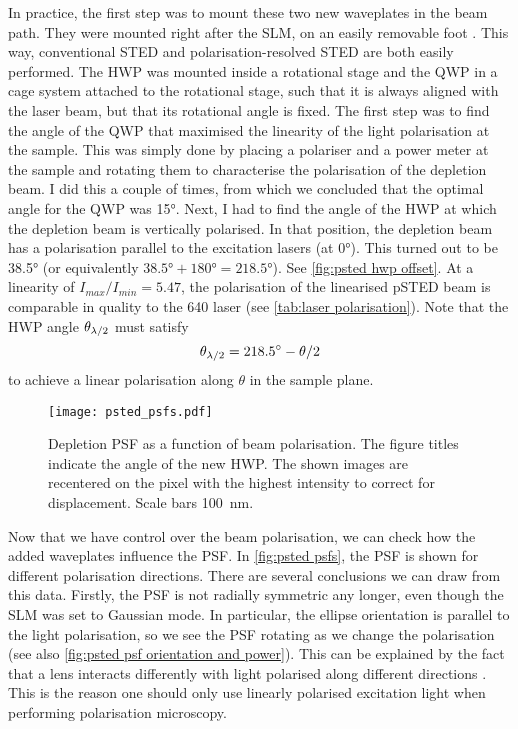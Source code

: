 In practice, the first step was to mount these two new waveplates in the beam path. They were mounted right after the SLM, on an easily removable foot .  This way, conventional STED and polarisation-resolved STED are both easily performed. The HWP was mounted inside a rotational stage and the QWP in a cage system attached to the rotational stage, such that it is always aligned with the laser beam, but that its rotational angle is fixed. The first step was to find the angle of the QWP that maximised the linearity of the light polarisation at the sample. This was simply done by placing a polariser and a power meter at the sample and rotating them to characterise the polarisation of the depletion beam. I did this a couple of times, from which we concluded that the optimal angle for the QWP was \ang{15}. Next, I had to find the angle of the HWP at which the depletion beam is vertically polarised. In that position, the depletion beam has a polarisation parallel to the excitation lasers (at \ang{0}). This turned out to be \ang{38.5} (or equivalently $\ang{38.5}+\ang{180}=\ang{218.5}$). See \autoref{fig:psted hwp offset}. At a linearity of $ I_{max}/I_{min} = 5.47 $, the polarisation of the linearised pSTED beam is comparable in quality to the 640 laser (see \autoref{tab:laser polarisation}). Note that the HWP angle $ \theta_{\lambda/2} $ must satisfy
\begin{equation}
	\theta_{\lambda/2} = \ang{218.5} - \theta/2
\end{equation} 
to achieve a linear polarisation along $ \theta $ in the sample plane.

\begin{figure}
	\centering
	\texttt{[image: psted\_psfs.pdf]}
	\caption{
		Depletion PSF as a function of beam polarisation. The figure titles indicate the angle of the new HWP. The shown images are recentered on the pixel with the highest intensity to correct for displacement. Scale bars 100~nm.
	}
	\label{fig:psted psfs}
\end{figure}

Now that we have control over the beam polarisation, we can check how the added waveplates influence the PSF. In \autoref{fig:psted psfs}, the PSF is shown for different polarisation directions. There are several conclusions we can draw from this data.  Firstly, the PSF is not radially symmetric any longer, even though the SLM was set to Gaussian mode. In particular, the ellipse orientation is parallel to the light polarisation, so we see the PSF rotating as we change the polarisation (see also \autoref{fig:psted psf orientation and power}). This can be explained by the fact that a lens interacts differently with light polarised along different directions \cite{Egner2020}. This is the reason one should only use linearly polarised excitation light when performing polarisation microscopy.

